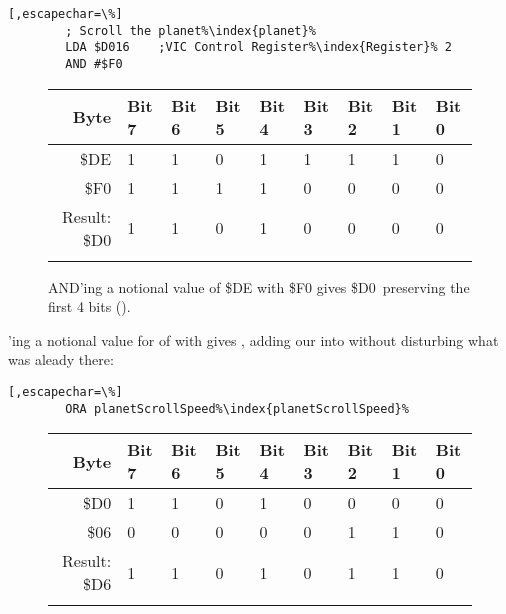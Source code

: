 \begin{lstlisting}[,escapechar=\%]
        ; Scroll the planet%\index{planet}%
        LDA $D016    ;VIC Control Register%\index{Register}% 2
        AND #$F0
\end{lstlisting}


\begin{figure}[H]
  {
    \setlength{\tabcolsep}{3.0pt}
    \setlength\cmidrulewidth{\heavyrulewidth} %
    \begin{adjustbox}{width=6cm,center}

      \begin{tabular}{rllllllll}
        \toprule
        Byte & Bit 7 & Bit 6 & Bit 5 & Bit 4 & Bit 3 & Bit 2 & Bit 1 & Bit 0        \\
        \midrule
        \$DE & 1 & 1 & 0 & 1 & 1 & 1 & 1 & 0 \\
        \$F0 & 1 & 1 & 1 & 1 & 0 & 0 & 0 & 0 \\
        \midrule
        Result: \$D0 & 1 & 1 & 0 & 1 & 0 & 0 & 0 & 0 \\
        \addlinespace
        \bottomrule
      \end{tabular}

    \end{adjustbox}

  }\caption*{AND'ing a notional value of \$DE with \$F0 gives \$D0\, preserving the first 4 bits ().}
\end{figure}

'ing a notional value for  of  with  gives , 
adding our  into  without disturbing what was aleady there:

\begin{lstlisting}[,escapechar=\%]
        ORA planetScrollSpeed%\index{planetScrollSpeed}%
\end{lstlisting}

\begin{figure}[H]
  {
    \setlength{\tabcolsep}{3.0pt}
    \setlength\cmidrulewidth{\heavyrulewidth} %
    \begin{adjustbox}{width=6cm,center}

      \begin{tabular}{rllllllll}
        \toprule
        Byte & Bit 7 & Bit 6 & Bit 5 & Bit 4 & Bit 3 & Bit 2 & Bit 1 & Bit 0        \\
        \midrule
        \$D0 & 1 & 1 & 0 & 1 & 0 & 0 & 0 & 0 \\
        \$06 & 0 & 0 & 0 & 0 & 0 & 1 & 1 & 0 \\
        \midrule
        Result: \$D6 & 1 & 1 & 0 & 1 & 0 & 1 & 1 & 0 \\
        \addlinespace
        \bottomrule
      \end{tabular}
    \end{adjustbox}
  }
\end{figure}

